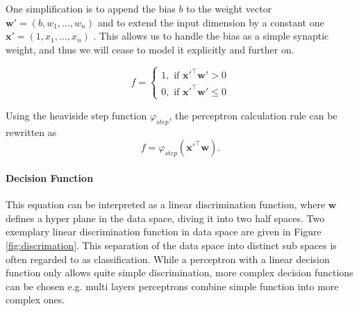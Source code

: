 One simplification is to append the bias $b$ to the weight vector $\textbf{w}' = (b , w_1, ... , w_n)$ and to extend the input dimension by a constant one $\textbf{x}' = (1, x_1 , ... , x_n)$ .
This allows us to handle the bias as a simple synaptic weight, and thus we will cease to  model it explicitly and further on.

\[
	f = 
		\begin{cases}
			1, \text{  if  } \textbf{x}'^\intercal \textbf{w}'> 0  \\
			0, \text{  if  } \textbf{x}'^\intercal \textbf{w}' \le 0
		\end{cases}	
\]



Using the heaviside step function $\varphi_{step}$, the perceptron calculation rule can be rewritten as 
\[
	f = \varphi_{step}(\textbf{x}'^\intercal \textbf{w}) .
\]   

\paragraph{Decision Function} \label{c:perdecision}

This equation can be interpreted as a linear discrimination function, where $\textbf{w}$ defines a hyper plane in the data space, diving it into two half spaces. 
Two exemplary linear discrimination function in data space are given in Figure \ref{fig:discrimation}.
This separation of the data space into distinct sub spaces is often regarded to as classification. 
While a perceptron with a linear decision function only allows quite simple discrimination, more complex decision functions can be chosen e.g. multi layers perceptrons combine simple function into more complex ones. 

